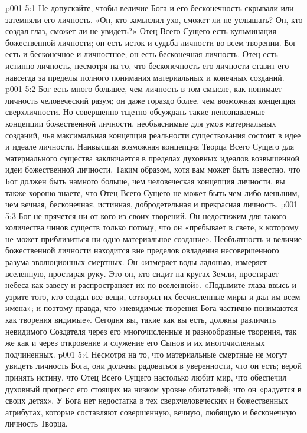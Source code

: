 \vs p001 5:1 Не допускайте, чтобы величие Бога и его бесконечность скрывали или затемняли его личность. «Он, кто замыслил ухо, сможет ли не услышать? Он, кто создал глаз, сможет ли не увидеть?» Отец Всего Сущего есть кульминация божественной личности; он есть исток и судьба личности во всем творении. Бог есть и бесконечное и личностное; он есть бесконечная личность. Отец есть истинно личность, несмотря на то, что бесконечность его личности ставит его навсегда за пределы полного понимания материальных и конечных созданий.
\vs p001 5:2 Бог есть много большее, чем личность в том смысле, как понимает личность человеческий разум; он даже гораздо более, чем возможная концепция сверхличности. Но совершенно тщетно обсуждать такие непознаваемые концепции божественной личности, необъяснимые для умов материальных созданий, чья максимальная концепция реальности существования состоит в идее и идеале личности. Наивысшая возможная концепция Творца Всего Сущего для материального существа заключается в пределах духовных идеалов возвышенной идеи божественной личности. Таким образом, хотя вам может быть известно, что Бог должен быть намного больше, чем человеческая концепция личности, вы также хорошо знаете, что Отец Всего Сущего не может быть чем\hyp{}либо меньшим, чем вечная, бесконечная, истинная, добродетельная и прекрасная личность.
\vs p001 5:3 Бог не прячется ни от кого из своих творений. Он недостижим для такого количества чинов существ только потому, что он «пребывает в свете, к которому не может приблизиться ни одно материальное создание». Необъятность и величие божественной личности находится вне пределов овладения несовершенного разума эволюционных смертных. Он «измеряет воды ладонью, измеряет вселенную, простирая руку. Это он, кто сидит на кругах Земли, простирает небеса как завесу и распространяет их по вселенной». «Подымите глаза ввысь и узрите того, кто создал все вещи, сотворил их бесчисленные миры и дал им всем имена»; и поэтому правда, что «невидимые творения Бога частично понимаются как творения видимые». Сегодня вы, такие как вы есть, должны различить невидимого Создателя через его многочисленные и разнообразные творения, так же как и через откровение и служение его Сынов и их многочисленных подчиненных.
\vs p001 5:4 Несмотря на то, что материальные смертные не могут увидеть личность Бога, они должны радоваться в уверенности, что он есть; верой принять истину, что Отец Всего Сущего настолько любит мир, что обеспечил духовный прогресс его стоящих на низком уровне обитателей; что он «радуется в своих детях». У Бога нет недостатка в тех сверхчеловеческих и божественных атрибутах, которые составляют совершенную, вечную, любящую и бесконечную личность Творца.
